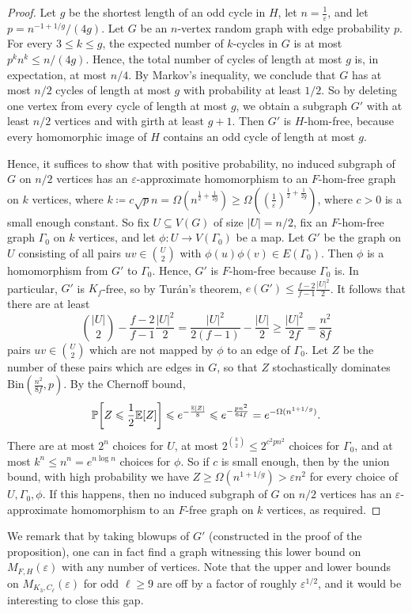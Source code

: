 \documentclass[reqno, english, 12pt]{amsart}
\theoremstyle{plain}
\theoremstyle{remark}
\renewcommand{\leq}{\leqslant}
\renewcommand{\geq}{\geqslant}
\newcommand{\e}{\ensuremath{\varepsilon}}
\let\originalleft\left
\let\originalright\right
\renewcommand{\left}{\mathopen{}\mathclose\bgroup\originalleft}
\renewcommand{\right}{\aftergroup\egroup\originalright}
\begin{document}
\begin{proof}
	Let $g$ be the shortest length of an odd cycle in $H$, let $n = \frac{1}{\varepsilon}$, and let $p = n^{-1+1/g}/(4g)$. Let
	$G$ be an $n$-vertex random graph with edge probability $p$. For every $3 \leq k \leq g$, the expected number of $k$-cycles in $G$ is at most $p^k n^k \leq n/(4g)$. Hence, the total number of cycles of length at most $g$ is, in expectation, at most $n/4$. By Markov's inequality, we conclude that $G$ has at most $n/2$ cycles of length at most $g$ with probability at least $1/2$. So by deleting one vertex from every cycle of length at most $g$, we obtain a subgraph $G'$ with at least $n/2$ vertices and with girth at least $g+1$. Then $G'$ is $H$-hom-free, because every homomorphic image of $H$ contains an odd cycle of length at most $g$.

	Hence, it suffices to show that with positive probability, no induced subgraph of $G$ on $n/2$ vertices has an $\varepsilon$-approximate homomorphism to an $F$-hom-free graph on $k$ vertices, where 
	$k \coloneqq c\sqrt{p}n = \Omega(n^{\frac{1}{2} + \frac{1}{2g}}) \geq \Omega((\frac{1}{\varepsilon})^{\frac{1}{2} + \frac{1}{2g}})$, where $c > 0$ is a small enough constant.
	So fix $U \subseteq V(G)$ of size $|U| = n/2$,
	fix an $F$-hom-free graph $\Gamma_0$ on $k$ vertices, and let $\phi : U \rightarrow V(\Gamma_0)$ be a map. 
	Let $G'$ be the graph on $U$ consisting of all pairs $uv \in \binom{U}{2}$ with $\phi(u)\phi(v) \in E(\Gamma_0)$. 
	Then $\phi$ is a homomorphism from $G'$ to $\Gamma_0$. Hence, $G'$ is $F$-hom-free because $\Gamma_0$ is. In particular, $G'$ is $K_f$-free, so by Tur\'an's theorem, 
	$e(G') \leq \frac{f-2}{f-1}\frac{|U|^2}{2}$. 
	It follows that there are at least 
	$$
	\binom{|U|}{2} - \frac{f-2}{f-1}\frac{|U|^2}{2} =
	\frac{|U|^2}{2(f-1)} - \frac{|U|}{2} \geq 
	\frac{|U|^2}{2f} = \frac{n^2}{8f}
	$$ pairs 
	$uv \in \binom{U}{2}$
	which are not mapped by $\phi$ to an edge of $\Gamma_0$. Let $Z$ be the number of these pairs which are edges in $G$, so that $Z$ stochastically dominates 
	$\text{Bin}(\frac{n^2}{8f},p)$. By the Chernoff bound,
	$$
	\mathbb{P}\left[ Z \leq \frac{1}{2}\mathbb{E}[Z] \right] \leq e^{-\frac{\mathbb{E}[Z]}{8}} \leq e^{-\frac{pn^2}{64f}} = 
	e^{-\Omega(n^{1+1/g})}. 
	$$
	There are at most $2^n$ choices for $U$, at most $2^{\binom{k}{2}} \leq 2^{c^2pn^2}$ choices for $\Gamma_0$, and at most $k^n \leq n^n = e^{n\log n}$ choices for $\phi$. So if $c$ is small enough, then by the union bound, with high probability we have $Z \geq \Omega(n^{1+1/g}) > \varepsilon n^2$ for every choice of $U,\Gamma_0,\phi$. If this happens, then no induced subgraph of $G$ on $n/2$ vertices has an $\varepsilon$-approximate homomorphism to an $F$-free graph on $k$ vertices, as required.  
\end{proof}
We remark that by taking blowups of $G'$ (constructed in the proof of the proposition), one can in fact find a graph witnessing this lower bound on $M_{F,H}(\varepsilon)$ with any number of vertices. Note that the upper and lower bounds on $M_{K_3,C_{\ell}}(\e)$ for odd $\ell \geq 9$ are off by a factor of roughly $\e^{1/2}$, and it would be interesting to close this gap.
\end{document}
